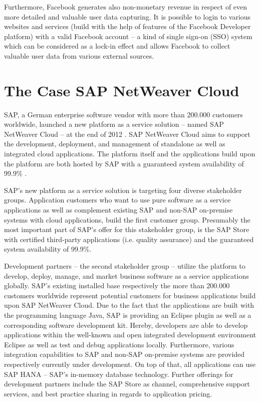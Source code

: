 Furthermore, Facebook generates also non-monetary revenue in respect of even more detailed and valuable user data capturing. It is possible to login to various websites and services (build with the help of features of the Facebook Developer platform) with a valid Facebook account -- a kind of single sign-on (SSO) system which can be considered as a lock-in effect and allows Facebook to collect valuable user data from various external sources.


\section{The Case SAP NetWeaver Cloud}\label{ch:sota:sap}

SAP, a German enterprise software vendor with more than 200.000 customers worldwide, launched a new platform as a service solution -- named SAP NetWeaver Cloud -- at the end of 2012 \citep{SAP2013a, SAP2013b}. SAP NetWeaver Cloud aims to support the development, deployment, and management of standalone as well as integrated cloud applications. The platform itself and the applications build upon the platform are both hosted by SAP with a guaranteed system availability of 99.9\% \citep{SAP2013b}.

SAP's new platform as a service solution is targeting four diverse stakeholder groups. Application customers who want to use pure software as a service applications as well as complement existing SAP and non-SAP on-premise systems with cloud applications, build the first customer group. Presumably the most important part of SAP's offer for this stakeholder group, is the SAP Store with certified third-party applications (i.e. quality assurance) and the guaranteed system availability of 99.9\%.

Development partners -- the second stakeholder group -- utilize the platform to develop, deploy, manage, and market business software as a service applications globally. SAP's existing installed base respectively the more than 200.000 customers worldwide represent potential customers for business applications build upon SAP NetWeaver Cloud. Due to the fact that the applications are built with the programming language Java, SAP is providing an Eclipse plugin as well as a corresponding software development kit. Hereby, developers are able to develop applications within the well-known and open integrated development environment Eclipse as well as test and debug applications locally. Furthermore, various integration capabilities to SAP and non-SAP on-premise systems are provided respectively currently under development. On top of that, all applications can use SAP HANA -- SAP's in-memory database technology. Further offerings for development partners include the SAP Store as channel, comprehensive support services, and best practice sharing in regards to application pricing.


